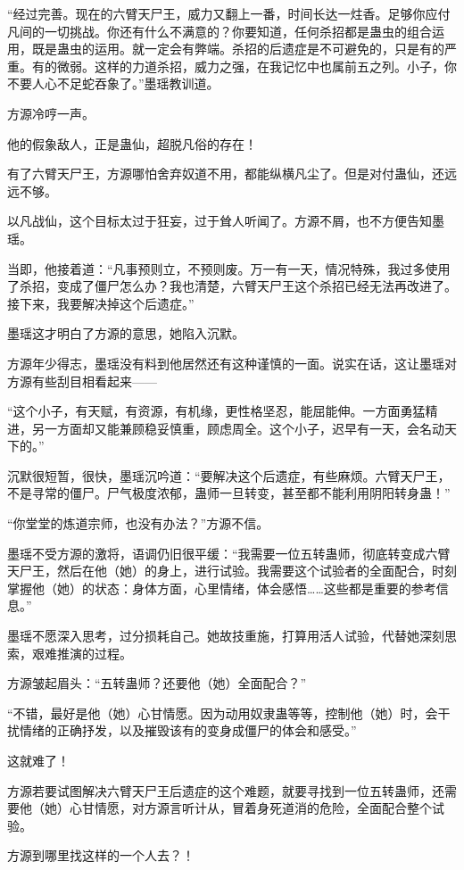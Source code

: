 \begin{this_body}
“经过完善。现在的六臂天尸王，威力又翻上一番，时间长达一炷香。足够你应付凡间的一切挑战。你还有什么不满意的？你要知道，任何杀招都是蛊虫的组合运用，既是蛊虫的运用。就一定会有弊端。杀招的后遗症是不可避免的，只是有的严重。有的微弱。这样的力道杀招，威力之强，在我记忆中也属前五之列。小子，你不要人心不足蛇吞象了。”墨瑶教训道。

方源冷哼一声。

他的假象敌人，正是蛊仙，超脱凡俗的存在！

有了六臂天尸王，方源哪怕舍弃奴道不用，都能纵横凡尘了。但是对付蛊仙，还远远不够。

以凡战仙，这个目标太过于狂妄，过于耸人听闻了。方源不屑，也不方便告知墨瑶。

当即，他接着道：“凡事预则立，不预则废。万一有一天，情况特殊，我过多使用了杀招，变成了僵尸怎么办？我也清楚，六臂天尸王这个杀招已经无法再改进了。接下来，我要解决掉这个后遗症。”

墨瑶这才明白了方源的意思，她陷入沉默。

方源年少得志，墨瑶没有料到他居然还有这种谨慎的一面。说实在话，这让墨瑶对方源有些刮目相看起来——

“这个小子，有天赋，有资源，有机缘，更性格坚忍，能屈能伸。一方面勇猛精进，另一方面却又能兼顾稳妥慎重，顾虑周全。这个小子，迟早有一天，会名动天下的。”

沉默很短暂，很快，墨瑶沉吟道：“要解决这个后遗症，有些麻烦。六臂天尸王，不是寻常的僵尸。尸气极度浓郁，蛊师一旦转变，甚至都不能利用阴阳转身蛊！”

“你堂堂的炼道宗师，也没有办法？”方源不信。

墨瑶不受方源的激将，语调仍旧很平缓：“我需要一位五转蛊师，彻底转变成六臂天尸王，然后在他（她）的身上，进行试验。我需要这个试验者的全面配合，时刻掌握他（她）的状态：身体方面，心里情绪，体会感悟……这些都是重要的参考信息。”

墨瑶不愿深入思考，过分损耗自己。她故技重施，打算用活人试验，代替她深刻思索，艰难推演的过程。

方源皱起眉头：“五转蛊师？还要他（她）全面配合？”

“不错，最好是他（她）心甘情愿。因为动用奴隶蛊等等，控制他（她）时，会干扰情绪的正确抒发，以及摧毁该有的变身成僵尸的体会和感受。”

这就难了！

方源若要试图解决六臂天尸王后遗症的这个难题，就要寻找到一位五转蛊师，还需要他（她）心甘情愿，对方源言听计从，冒着身死道消的危险，全面配合整个试验。

方源到哪里找这样的一个人去？！


\end{this_body}
